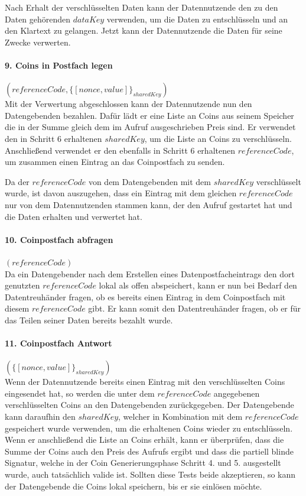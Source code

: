 \documentclass[11pt,a4paper]{scrreprt}
\begin{document}
Nach Erhalt der verschlüsselten Daten kann der Datennutzende den zu den Daten gehörenden $dataKey$ verwenden, um die Daten zu entschlüsseln und an den Klartext zu gelangen. Jetzt kann der Datennutzende die Daten für seine Zwecke verwerten.

\paragraph{9. Coins in Postfach legen} $(referenceCode, \{[nonce,value]\}_{sharedKey})$\\
\label{para:payment_9}
Mit der Verwertung abgeschlossen kann der Datennutzende nun den Datengebenden bezahlen. Dafür lädt er eine Liste an Coins aus seinem Speicher die in der Summe gleich dem im Aufruf ausgeschrieben Preis sind. Er verwendet den in Schritt 6 erhaltenen $sharedKey$, um die Liste an Coins zu verschlüsseln. Anschließend verwendet er den ebenfalls in Schritt 6 erhaltenen $referenceCode$, um zusammen einen Eintrag an das Coinpostfach zu senden.

Da der $referenceCode$ von dem Datengebenden mit dem $sharedKey$ verschlüsselt wurde, ist davon auszugehen, dass ein Eintrag mit dem gleichen $referenceCode$ nur von dem Datennutzenden stammen kann, der den Aufruf gestartet hat und die Daten erhalten und verwertet hat.

\paragraph{10. Coinpostfach abfragen} $(referenceCode)$\\
Da ein Datengebender nach dem Erstellen eines Datenpostfacheintrags den dort genutzten $referenceCode$ lokal als offen abspeichert, kann er nun bei Bedarf den Datentreuhänder fragen, ob es bereits einen Eintrag in dem Coinpostfach mit diesem $referenceCode$ gibt. Er kann somit den Datentreuhänder fragen, ob er für das Teilen seiner Daten bereits bezahlt wurde.

\paragraph{11. Coinpostfach Antwort} $(\{[nonce,value]\}_{sharedKey})$\\
Wenn der Datennutzende bereits einen Eintrag mit den verschlüsselten Coins eingesendet hat, so werden die unter dem $referenceCode$ angegebenen verschlüsselten Coins an den Datengebenden zurückgegeben. Der Datengebende kann daraufhin den $sharedKey$, welcher in Kombination mit dem $referenceCode$ gespeichert wurde verwenden, um die erhaltenen Coins wieder zu entschlüsseln. Wenn er anschließend die Liste an Coins erhält, kann er überprüfen, dass die Summe der Coins auch den Preis des Aufrufs ergibt und dass die partiell blinde Signatur, welche in der Coin Generierungsphase Schritt 4. und 5. ausgestellt wurde, auch tatsächlich valide ist. Sollten diese Tests beide akzeptieren, so kann der Datengebende die Coins lokal speichern, bis er sie einlösen möchte.
\end{document}
